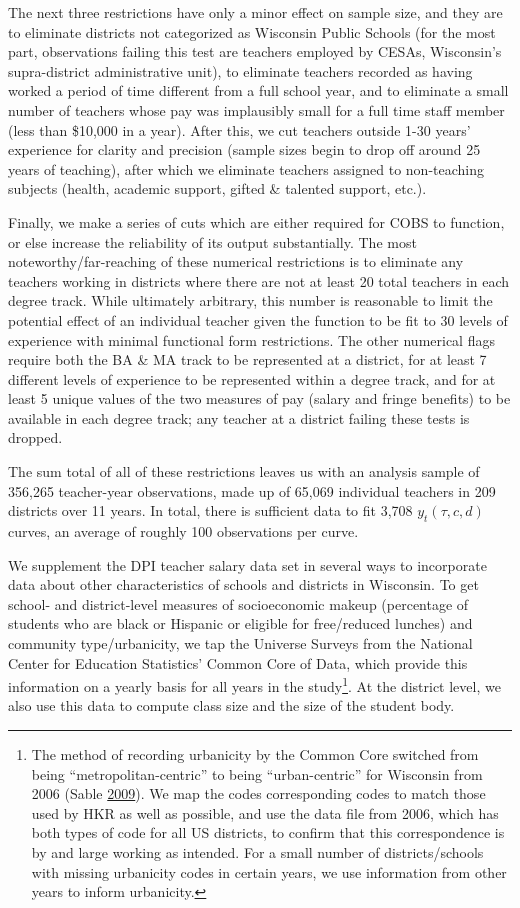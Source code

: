 \documentclass[12pt,]{article}
\let\rmarkdownfootnote\footnote%
\def\footnote{\protect\rmarkdownfootnote}
\begin{document}
The next three restrictions have only a minor effect on sample size, and
they are to eliminate districts not categorized as Wisconsin Public
Schools (for the most part, observations failing this test are teachers
employed by CESAs, Wisconsin's supra-district administrative unit), to
eliminate teachers recorded as having worked a period of time different
from a full school year, and to eliminate a small number of teachers
whose pay was implausibly small for a full time staff member (less than
\$10,000 in a year). After this, we cut teachers outside 1-30 years'
experience for clarity and precision (sample sizes begin to drop off
around 25 years of teaching), after which we eliminate teachers assigned
to non-teaching subjects (health, academic support, gifted \& talented
support, etc.).

Finally, we make a series of cuts which are either required for COBS to
function, or else increase the reliability of its output substantially.
The most noteworthy/far-reaching of these numerical restrictions is to
eliminate any teachers working in districts where there are not at least
20 total teachers in each degree track. While ultimately arbitrary, this
number is reasonable to limit the potential effect of an individual
teacher given the function to be fit to 30 levels of experience with
minimal functional form restrictions. The other numerical flags require
both the BA \& MA track to be represented at a district, for at least 7
different levels of experience to be represented within a degree track,
and for at least 5 unique values of the two measures of pay (salary and
fringe benefits) to be available in each degree track; any teacher at a
district failing these tests is dropped.

The sum total of all of these restrictions leaves us with an analysis
sample of 356,265 teacher-year observations, made up of 65,069
individual teachers in 209 districts over 11 years. In total, there is
sufficient data to fit 3,708 \(y_t(\tau, c, d)\) curves, an average of
roughly 100 observations per curve.

We supplement the DPI teacher salary data set in several ways to
incorporate data about other characteristics of schools and districts in
Wisconsin. To get school- and district-level measures of socioeconomic
makeup (percentage of students who are black or Hispanic or eligible for
free/reduced lunches) and community type/urbanicity, we tap the Universe
Surveys from the National Center for Education Statistics' Common Core
of Data, which provide this information on a yearly basis for all years
in the study\footnote{The method of recording urbanicity by the Common
  Core switched from being ``metropolitan-centric'' to being
  ``urban-centric'' for Wisconsin from 2006 (Sable
  \protect\hyperlink{ref-sable}{2009}). We map the codes corresponding
  codes to match those used by HKR as well as possible, and use the data
  file from 2006, which has both types of code for all US districts, to
  confirm that this correspondence is by and large working as intended.
  For a small number of districts/schools with missing urbanicity codes
  in certain years, we use information from other years to inform
  urbanicity.}. At the district level, we also use this data to compute
class size and the size of the student body.
\end{document}
